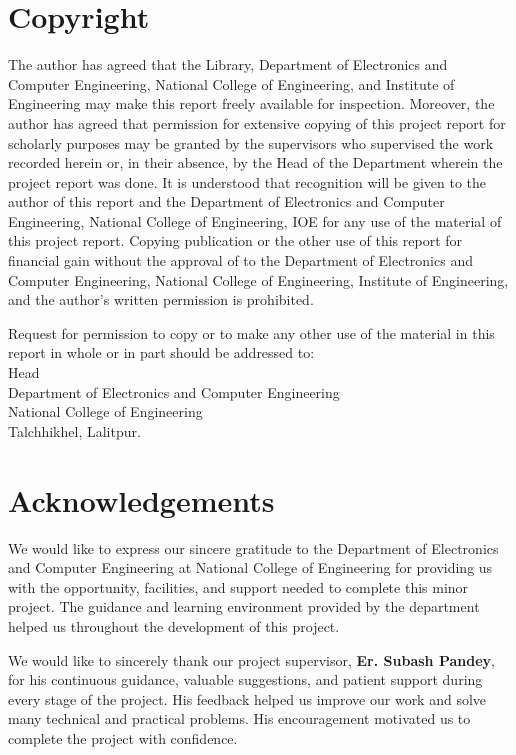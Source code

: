 \documentclass[12pt]{report}
\numberwithin{figure}{chapter}
\numberwithin{table}{chapter}
\numberwithin{equation}{chapter}
\begin{document}
\chapter*{Copyright}
The author has agreed that the Library, Department of Electronics and Computer Engineering, National College of Engineering, and Institute of Engineering may make this report freely available for inspection. Moreover, the author has agreed that permission for extensive copying of this project report for scholarly purposes may be granted by the supervisors who supervised the work recorded herein or, in their absence, by the Head of the Department wherein the project report was done. It is understood that recognition will be given to the author of this report and the Department of Electronics and Computer Engineering, National College of Engineering, IOE for any use of the material of this project report. Copying publication or the other use of this report for financial gain without the approval of to the Department of Electronics and Computer Engineering, National College of Engineering, Institute of Engineering, and the author's written permission is prohibited.

Request for permission to copy or to make any other use of the material in this report in whole or in part should be addressed to:\\
\newline
\newline
\newline
Head\\
Department of Electronics and Computer Engineering\\
National College of Engineering\\
Talchhikhel, Lalitpur.

\chapter*{Acknowledgements}
We would like to express our sincere gratitude to the Department of Electronics and Computer Engineering at National College of Engineering for providing us with the opportunity, facilities, and support needed to complete this minor project. The guidance and learning environment provided by the department helped us throughout the development of this project.

We would like to sincerely thank our project supervisor, \textbf{Er. Subash Pandey}, for his continuous guidance, valuable suggestions, and patient support during every stage of the project. His feedback helped us improve our work and solve many technical and practical problems. His encouragement motivated us to complete the project with confidence.
\end{document}
